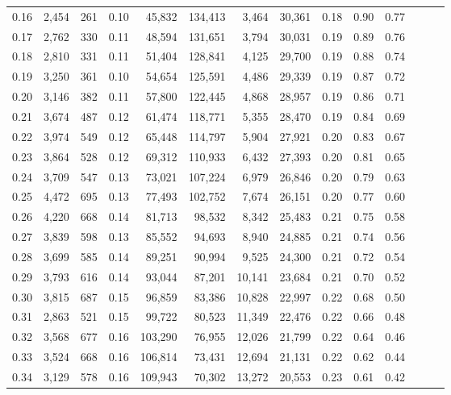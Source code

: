 \begin{tabular}{rrrrrrrrrrrrrr}
0.16 &  2,454 &  261 &  0.10 &   45,832 &  134,413 &   3,464 &  30,361 &  0.18 &  0.90 &      0.77 \\
0.17 &  2,762 &  330 &  0.11 &   48,594 &  131,651 &   3,794 &  30,031 &  0.19 &  0.89 &      0.76 \\
0.18 &  2,810 &  331 &  0.11 &   51,404 &  128,841 &   4,125 &  29,700 &  0.19 &  0.88 &      0.74 \\
0.19 &  3,250 &  361 &  0.10 &   54,654 &  125,591 &   4,486 &  29,339 &  0.19 &  0.87 &      0.72 \\
0.20 &  3,146 &  382 &  0.11 &   57,800 &  122,445 &   4,868 &  28,957 &  0.19 &  0.86 &      0.71 \\
0.21 &  3,674 &  487 &  0.12 &   61,474 &  118,771 &   5,355 &  28,470 &  0.19 &  0.84 &      0.69 \\
0.22 &  3,974 &  549 &  0.12 &   65,448 &  114,797 &   5,904 &  27,921 &  0.20 &  0.83 &      0.67 \\
0.23 &  3,864 &  528 &  0.12 &   69,312 &  110,933 &   6,432 &  27,393 &  0.20 &  0.81 &      0.65 \\
0.24 &  3,709 &  547 &  0.13 &   73,021 &  107,224 &   6,979 &  26,846 &  0.20 &  0.79 &      0.63 \\
0.25 &  4,472 &  695 &  0.13 &   77,493 &  102,752 &   7,674 &  26,151 &  0.20 &  0.77 &      0.60 \\
0.26 &  4,220 &  668 &  0.14 &   81,713 &   98,532 &   8,342 &  25,483 &  0.21 &  0.75 &      0.58 \\
0.27 &  3,839 &  598 &  0.13 &   85,552 &   94,693 &   8,940 &  24,885 &  0.21 &  0.74 &      0.56 \\
0.28 &  3,699 &  585 &  0.14 &   89,251 &   90,994 &   9,525 &  24,300 &  0.21 &  0.72 &      0.54 \\
0.29 &  3,793 &  616 &  0.14 &   93,044 &   87,201 &  10,141 &  23,684 &  0.21 &  0.70 &      0.52 \\
0.30 &  3,815 &  687 &  0.15 &   96,859 &   83,386 &  10,828 &  22,997 &  0.22 &  0.68 &      0.50 \\
0.31 &  2,863 &  521 &  0.15 &   99,722 &   80,523 &  11,349 &  22,476 &  0.22 &  0.66 &      0.48 \\
0.32 &  3,568 &  677 &  0.16 &  103,290 &   76,955 &  12,026 &  21,799 &  0.22 &  0.64 &      0.46 \\
0.33 &  3,524 &  668 &  0.16 &  106,814 &   73,431 &  12,694 &  21,131 &  0.22 &  0.62 &      0.44 \\
0.34 &  3,129 &  578 &  0.16 &  109,943 &   70,302 &  13,272 &  20,553 &  0.23 &  0.61 &      0.42 \\

\end{tabular}
